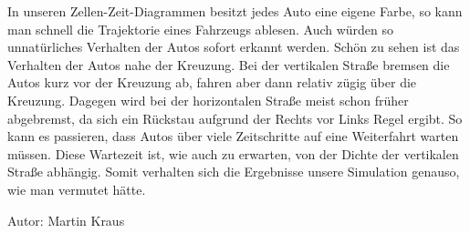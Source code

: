 \noindent
In unseren Zellen-Zeit-Diagrammen besitzt jedes Auto eine eigene Farbe, so kann man schnell die Trajektorie eines Fahrzeugs ablesen. Auch würden so unnatürliches Verhalten der Autos sofort erkannt werden. Schön zu sehen ist das Verhalten der Autos nahe der Kreuzung. Bei der vertikalen Straße bremsen die Autos kurz vor der Kreuzung ab, fahren aber dann relativ zügig über die Kreuzung. Dagegen wird bei der horizontalen Straße meist schon früher abgebremst, da sich ein Rückstau aufgrund der Rechts vor Links Regel ergibt. So kann es passieren, dass Autos über viele Zeitschritte auf eine Weiterfahrt warten müssen. Diese Wartezeit ist, wie auch zu erwarten, von der Dichte der vertikalen Straße abhängig. Somit verhalten sich die Ergebnisse unsere Simulation genauso, wie man vermutet hätte.

\begin{flushright}
Autor: Martin Kraus
\end{flushright}